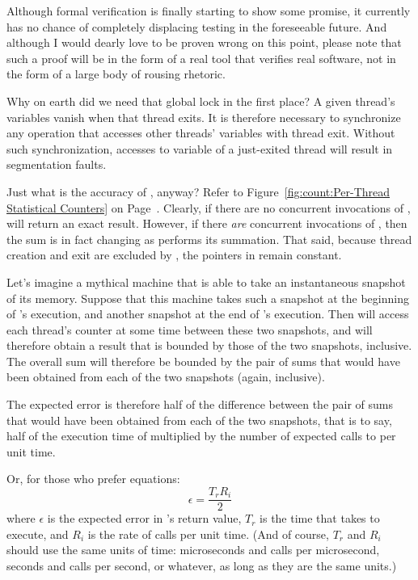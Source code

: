 	Although formal verification is finally starting to show some
	promise, it currently has no chance of completely displacing testing
	in the foreseeable future.
	And although I would dearly love to be proven wrong on this point,
	please note that such a proof will be in the form of a real tool
	that verifies real software, not in the form of a large body of
	rousing rhetoric.

\QuickQ{}
	Why on earth did we need that global lock in the first place?
\QuickA{}
	A given thread's  variables vanish when that
	thread exits.
	It is therefore necessary to synchronize any operation that
	accesses other threads'  variables with
	thread exit.
	Without such synchronization, accesses to  variable
	of a just-exited thread will result in segmentation faults.

\QuickQ{}
	Just what is the accuracy of , anyway?
\QuickA{}
	Refer to
	Figure~\ref{fig:count:Per-Thread Statistical Counters} on
	Page~\pageref{fig:count:Per-Thread Statistical Counters}.
	Clearly, if there are no concurrent invocations of ,
	 will return an exact result.
	However, if there \emph{are} concurrent invocations of
	, then the sum is in fact changing as
	 performs its summation.
	That said, because thread creation and exit are excluded by
	, the pointers in  remain constant.

	Let's imagine a mythical machine that is able to take an
	instantaneous snapshot of its memory.
	Suppose that this machine takes such a snapshot at the
	beginning of 's execution, and another
	snapshot at the end of 's execution.
	Then  will access each thread's counter
	at some time between these two snapshots, and will therefore
	obtain a result that is bounded by those of the two snapshots,
	inclusive.
	The overall sum will therefore be bounded by the pair of sums that
	would have been obtained from each of the two snapshots (again,
	inclusive).

	The expected error is therefore half of the difference between
	the pair of sums that would have been obtained from each of the
	two snapshots, that is to say, half of the execution time of
	 multiplied by the number of expected calls to
	 per unit time.

	Or, for those who prefer equations:
	\begin{equation}
	\epsilon = \frac{T_r R_i}{2}
	\end{equation}
	where $\epsilon$ is the expected error in 's
	return value,
	$T_r$ is the time that  takes to execute,
	and $R_i$ is the rate of  calls per unit time.
	(And of course, $T_r$ and $R_i$ should use the same units of
	time: microseconds and calls per microsecond, seconds and calls
	per second, or whatever, as long as they are the same units.)

